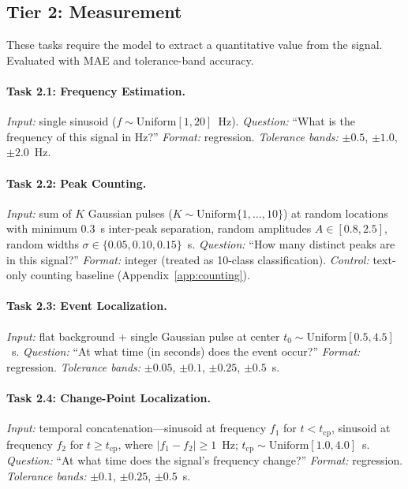 \documentclass[11pt]{article}
\begin{document}
\subsection{Tier 2: Measurement}

These tasks require the model to extract a quantitative value from the signal. Evaluated with MAE and tolerance-band accuracy.

\paragraph{Task 2.1: Frequency Estimation.}
\emph{Input:} single sinusoid ($f \sim \mathrm{Uniform}[1,20]$~Hz).
\emph{Question:} ``What is the frequency of this signal in Hz?''
\emph{Format:} regression.
\emph{Tolerance bands:} $\pm 0.5$, $\pm 1.0$, $\pm 2.0$~Hz.

\paragraph{Task 2.2: Peak Counting.}
\emph{Input:} sum of $K$ Gaussian pulses ($K \sim \mathrm{Uniform}\{1,\ldots,10\}$) at random locations with minimum 0.3~s inter-peak separation, random amplitudes $A \in [0.8,2.5]$, random widths $\sigma \in \{0.05, 0.10, 0.15\}$~s.
\emph{Question:} ``How many distinct peaks are in this signal?''
\emph{Format:} integer (treated as 10-class classification).
\emph{Control:} text-only counting baseline (Appendix~\ref{app:counting}).

\paragraph{Task 2.3: Event Localization.}
\emph{Input:} flat background + single Gaussian pulse at center $t_0 \sim \mathrm{Uniform}[0.5,4.5]$~s.
\emph{Question:} ``At what time (in seconds) does the event occur?''
\emph{Format:} regression.
\emph{Tolerance bands:} $\pm 0.05$, $\pm 0.1$, $\pm 0.25$, $\pm 0.5$~s.

\paragraph{Task 2.4: Change-Point Localization.}
\emph{Input:} temporal concatenation---sinusoid at frequency $f_1$ for $t < t_\text{cp}$, sinusoid at frequency $f_2$ for $t \geq t_\text{cp}$, where $|f_1 - f_2| \geq 1$~Hz; $t_\text{cp} \sim \mathrm{Uniform}[1.0, 4.0]$~s.
\emph{Question:} ``At what time does the signal's frequency change?''
\emph{Format:} regression.
\emph{Tolerance bands:} $\pm 0.1$, $\pm 0.25$, $\pm 0.5$~s.
\end{document}
